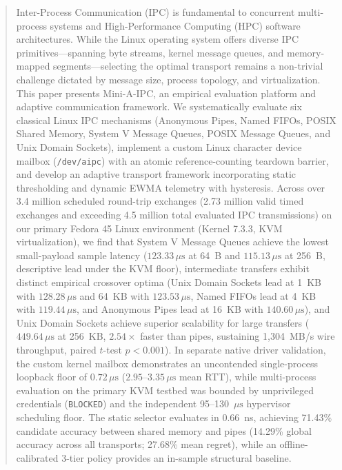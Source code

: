 \documentclass[conference]{IEEEtran}
\begin{document}
\begin{abstract}
Inter-Process Communication (IPC) is fundamental to concurrent multi-process systems and High-Performance Computing (HPC) software architectures. While the Linux operating system offers diverse IPC primitives---spanning byte streams, kernel message queues, and memory-mapped segments---selecting the optimal transport remains a non-trivial challenge dictated by message size, process topology, and virtualization. This paper presents Mini-A-IPC, an empirical evaluation platform and adaptive communication framework. We systematically evaluate six classical Linux IPC mechanisms (Anonymous Pipes, Named FIFOs, POSIX Shared Memory, System V Message Queues, POSIX Message Queues, and Unix Domain Sockets), implement a custom Linux character device mailbox (\texttt{/dev/aipc}) with an atomic reference-counting teardown barrier, and develop an adaptive transport framework incorporating static thresholding and dynamic EWMA telemetry with hysteresis. Across over 3.4 million scheduled round-trip exchanges (2.73 million valid timed exchanges and exceeding 4.5 million total evaluated IPC transmissions) on our primary Fedora 45 Linux environment (Kernel 7.3.3, KVM virtualization), we find that System V Message Queues achieve the lowest small-payload sample latency ($123.33\,\mu\text{s}$ at 64~B and $115.13\,\mu\text{s}$ at 256~B, descriptive lead under the KVM floor), intermediate transfers exhibit distinct empirical crossover optima (Unix Domain Sockets lead at 1~KB with $128.28\,\mu\text{s}$ and 64~KB with $123.53\,\mu\text{s}$, Named FIFOs lead at 4~KB with $119.44\,\mu\text{s}$, and Anonymous Pipes lead at 16~KB with $140.60\,\mu\text{s}$), and Unix Domain Sockets achieve superior scalability for large transfers ($449.64\,\mu\text{s}$ at 256~KB, $2.54\times$ faster than pipes, sustaining 1,304~MB/s wire throughput, paired $t$-test $p < 0.001$). In separate native driver validation, the custom kernel mailbox demonstrates an uncontended single-process loopback floor of $0.72\,\mu\text{s}$ ($2.95\text{--}3.35\,\mu\text{s}$ mean RTT), while multi-process evaluation on the primary KVM testbed was bounded by unprivileged credentials (\texttt{BLOCKED}) and the independent 95--130~$\mu\text{s}$ hypervisor scheduling floor. The static selector evaluates in 0.66~ns, achieving 71.43\% candidate accuracy between shared memory and pipes (14.29\% global accuracy across all transports; 27.68\% mean regret), while an offline-calibrated 3-tier policy provides an in-sample structural baseline.
\end{abstract}
\end{document}
